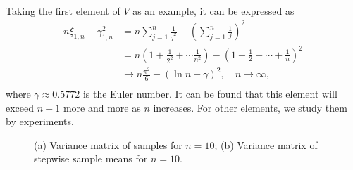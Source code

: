 \documentclass{article}
\begin{document}
Taking the first element of $\bar{V}$ as an example, it can be expressed as
\begin{equation}
  \begin{aligned}
    n\xi_{1,n}-\gamma_{1,n}^2
    &=n\sum_{j=1}^n\frac{1}{j^2}-\left(\sum_{j=1}^n\frac{1}{j}\right)^2\\
    &=n\left(1+\frac{1}{2^2}+\cdots\frac{1}{n^2}\right)-\left(1+\frac{1}{2}+\cdots+\frac{1}{n}\right)^2\\
    &\to n\frac{\pi^2}{6}-(\ln n+\gamma)^2,\quad n\to\infty,\\
  \end{aligned}
\end{equation}
where $\gamma\approx0.5772$ is the Euler number. It can be found that this element will exceed $n-1$ more and more as $n$ increases. For other elements, we study them by experiments.

\begin{figure}[!t]
  \centering
  \caption{(a) Variance matrix of samples for $n=10$; (b) Variance matrix of stepwise sample means for $n=10$.}
  \label{fig:var_10}
\end{figure}
\end{document}
